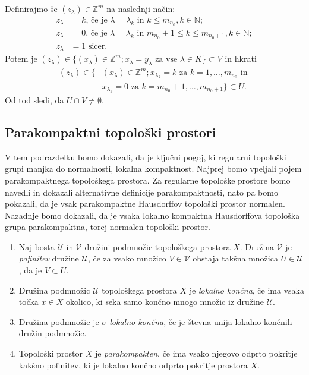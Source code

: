 \documentclass[mat1]{fmfdelo}
\newcommand{\N}{\mathbb N}
\newcommand{\Z}{\mathbb Z}
\begin{document}
\begin{dokaz}
Definirajmo še $(z_\lambda) \in \Z^m$ na naslednji način:
\begin{align*}
	z_\lambda &= k \text{, če je $\lambda = \lambda_k$ in $k \leq m_{n_0}$}, k \in \N; \\
	z_\lambda &= 0 \text{, če je $\lambda = \lambda_k$ in $m_{n_0} + 1 \leq k \leq m_{n_0+1}$}, k \in \N; \\
	z_\lambda &= 1 \text{ sicer.}
\end{align*}
Potem je $(z_\lambda) \in \lbrace (x_\lambda) \in \Z^m ; x_\lambda = y_\lambda \text{ za vse } \lambda  \in K \rbrace \subset V$ in hkrati
\begin{align*}
(z_\lambda) \in \lbrace &(x_\lambda) \in \Z^m ; x_{\lambda_k} = k \text{ za } k=1,\dots,m_{n_0} \text{ in }\\
& x_{\lambda_k} = 0 \text{ za } k = m_{n_0}+1,\dots, m_{n_0 + 1}\rbrace \subset U.
\end{align*}
Od tod sledi, da $U \cap V \neq \emptyset$.
\end{dokaz}

\subsection{Parakompaktni topološki prostori}
V tem podrazdelku bomo dokazali, da je ključni pogoj, ki regularni topološki grupi manjka do normalnosti, lokalna kompaktnost. Najprej bomo vpeljali pojem parakompaktnega topološkega prostora. Za regularne topološke prostore bomo navedli in dokazali alternativne definicije parakompaktnosti, nato pa bomo pokazali, da je vsak parakompaktne Hausdorffov topološki prostor normalen. Nazadnje bomo dokazali, da je vsaka lokalno kompaktna Hausdorffova topološka grupa parakompaktna, torej normalen topološki prostor.

\begin{definicija}\label{def:parakompakt}
	\begin{enumerate}
		\item Naj bosta $\mathcal{U}$ in $\mathcal{V}$ družini podmnožic topološkega prostora $X$. Družina $\mathcal{V}$ je \emph{pofinitev} družine $\mathcal{U}$, če za vsako množico $V \in \mathcal{V}$ obstaja takšna množica $U \in \mathcal{U}$, da je $V \subset U$.
		\item Družina podmnožic $\mathcal{U}$ topološkega prostora $X$ je \emph{lokalno končna}, če ima vsaka točka $x \in X$ okolico, ki seka samo končno mnogo množic iz družine $\mathcal{U}$.
		\item Družina podmnožic je \emph{$\sigma$-lokalno končna}, če je števna unija lokalno končnih družin podmnožic.
		\item Topološki prostor $X$ je \emph{parakompakten}, če ima vsako njegovo odprto pokritje kakšno pofinitev, ki je lokalno končno odprto pokritje prostora $X$.
	\end{enumerate}
\end{definicija}
\end{document}
